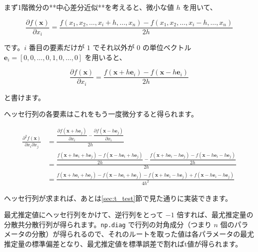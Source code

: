     まず1階微分の**中心差分近似**を考えると、微小な値 $h$ を用いて、

    \begin{equation}
        \frac{\partial f(\boldsymbol x)}{\partial x_i} = \frac{f(x_1, x_2,\ldots, x_i+h, \ldots, x_n) - f(x_1, x_2,\ldots, x_i-h, \ldots, x_n)}{2h}
    \end{equation}

    です。$i$ 番目の要素だけが $1$ でそれ以外が $0$ の単位ベクトル $\boldsymbol e_i = [0,0,\ldots,0,1,0,\ldots,0]$ を用いると、

    \begin{equation}
        \frac{\partial f(\boldsymbol x)}{\partial x_i} = \frac{f(\boldsymbol x + h\boldsymbol e_i) - f(\boldsymbol x - h\boldsymbol e_i)}{2h}
    \end{equation}

    と書けます。

    ヘッセ行列の各要素はこれをもう一度微分すると得られます。

    \begin{equation}
        \begin{aligned}
            \frac{\partial^2 f(\boldsymbol x)}{\partial x_i \partial x_j}
             & = \frac{\dfrac{\partial f(\boldsymbol x + h\boldsymbol e_j)}{\partial x_i} - \dfrac{\partial f(\boldsymbol x - h\boldsymbol e_j)}{\partial x_i}}{2h}                                                                                                                   \\
             & = \frac{\dfrac{f(\boldsymbol x + h\boldsymbol e_i + h\boldsymbol e_j) - f(\boldsymbol x - h\boldsymbol e_i + h\boldsymbol e_j)}{2h} - \dfrac{f(\boldsymbol x + h\boldsymbol e_i - h\boldsymbol e_j) - f(\boldsymbol x - h\boldsymbol e_i - h\boldsymbol e_j)}{2h}}{2h} \\
             & = \frac{f(\boldsymbol x + h\boldsymbol e_i + h\boldsymbol e_j) - f(\boldsymbol x - h\boldsymbol e_i + h\boldsymbol e_j) -f(\boldsymbol x + h\boldsymbol e_i - h\boldsymbol e_j) + f(\boldsymbol x - h\boldsymbol e_i - h\boldsymbol e_j)}{4h^2}
        \end{aligned}
    \end{equation}

    ヘッセ行列が求まれば、あとは\ref{sec:t_test}節で見た通りに実装できます。

    最尤推定値にヘッセ行列をかけて、逆行列をとって $-1$ 倍すれば、最尤推定量の分散共分散行列が得られます。\lstinline{np.diag} で行列の対角成分（つまり $n$ 個のパラメータの分散）が得られるので、それのルートを取った値は各パラメータの最尤推定量の標準偏差となり、最尤推定値を標準誤差で割ればt値が得られます。

